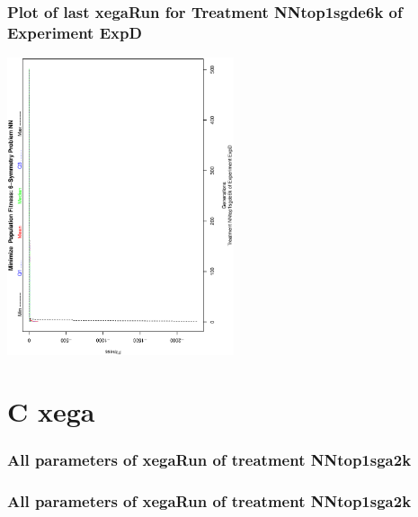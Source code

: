 \documentclass[18pt,c]{beamer}
\makeatletter
\let\beamer@writeslidentry@miniframeson=\beamer@writeslidentry
\newcommand*{\miniframeson}{\let\beamer@writeslidentry=\beamer@writeslidentry@miniframeson}
\makeatother
\begin{document}
 \begin{frame}
 \frametitle{ Plot of last xegaRun for Treatment NNtop1sgde6k of Experiment ExpD }
 \begin{center}
\includegraphics[width=0.5\textwidth, angle=-90]
{ExpDPlotPopStatsFigure009.eps}
 \end{center}
 \label{report/ExpDPlotPopStatsFigure009.eps}  
 \end{frame}

\miniframeson
\section{C xega}

 \begin{frame}
 \fontsize{8pt}{9pt}\selectfont
 \frametitle{  All parameters of xegaRun of treatment NNtop1sga2k 
 }

 \label{ExpDtParmTable030.tex}  
 \end{frame}


 \begin{frame}
 \fontsize{8pt}{9pt}\selectfont
 \frametitle{  All parameters of xegaRun of treatment NNtop1sga2k 
 }

 \label{ExpDtParmTable031.tex}  
 \end{frame}
\end{document}
